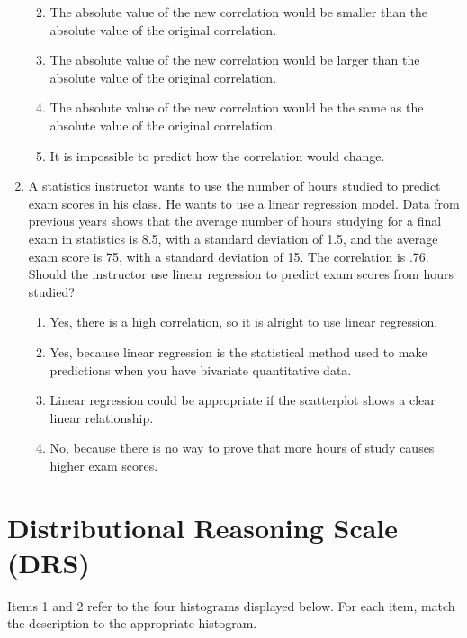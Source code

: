 \documentclass[11pt]{umnthesis}
\begin{document}
\begin{enumerate}
  \begin{enumerate}
  \def\labelenumii{\alph{enumii}.}
  \tightlist
  \item
    The absolute value of the new correlation would be smaller than the absolute value of the original correlation.
  \item
    The absolute value of the new correlation would be larger than the absolute value of the original correlation.
  \item
    The absolute value of the new correlation would be the same as the absolute value of the original correlation.
  \item
    It is impossible to predict how the correlation would change.
  \end{enumerate}
\item
  A statistics instructor wants to use the number of hours studied to predict exam scores in his class. He wants to use a linear regression model. Data from previous years shows that the average number of hours studying for a final exam in statistics is 8.5, with a standard deviation of 1.5, and the average exam score is 75, with a standard deviation of 15. The correlation is .76. Should the instructor use linear regression to predict exam scores from hours studied?

  \begin{enumerate}
  \def\labelenumii{\alph{enumii}.}
  \tightlist
  \item
    Yes, there is a high correlation, so it is alright to use linear regression.
  \item
    Yes, because linear regression is the statistical method used to make predictions when you have bivariate quantitative data.
  \item
    Linear regression could be appropriate if the scatterplot shows a clear linear relationship.
  \item
    No, because there is no way to prove that more hours of study causes higher exam scores.
  \end{enumerate}
\end{enumerate}

\hypertarget{distributional-reasoning-scale-drs}{%
\section*{Distributional Reasoning Scale (DRS)}\label{distributional-reasoning-scale-drs}}

Items 1 and 2 refer to the four histograms displayed below. For each item, match the description to the appropriate histogram.
\end{document}
